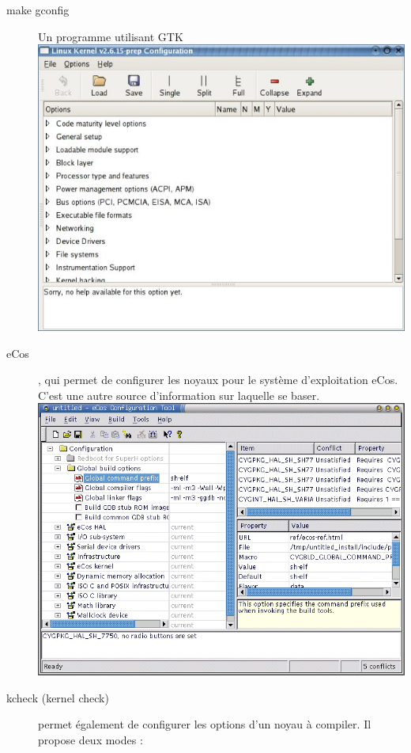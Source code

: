 \documentclass[16pts]{report}
\begin{document}
\begin{description}
    \item[make gconfig] 	    Un programme utilisant GTK \\
        \includegraphics[scale=1]{illustrations/gconfig.jpg} \\
    \item[eCos] , qui permet de configurer les noyaux pour le système
        d’exploitation eCos. C’est une autre source d’information
        sur laquelle se baser. \\ 
        \includegraphics[scale=1.3]{illustrations/eCos_config.png} \pagebreak
	\item[kcheck (kernel check)] permet également de configurer les options d’un noyau
    	à compiler.
Il propose deux modes :


\end{description}
\end{document}
